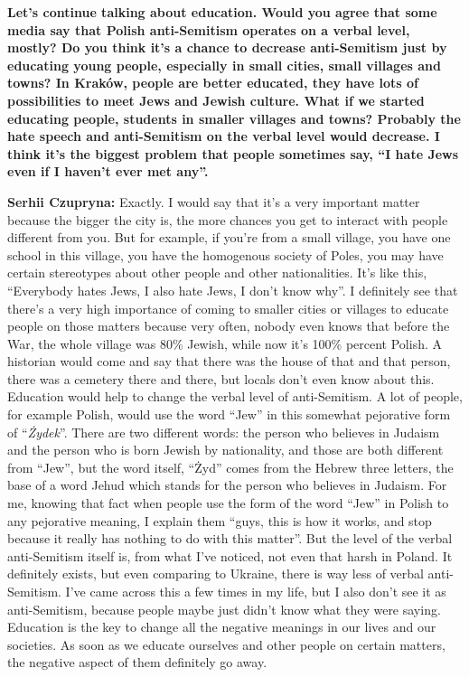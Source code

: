 \textbf{Let’s continue talking about education. Would you agree that some media say that Polish anti-Semitism operates on a verbal level, mostly? Do you think it’s a chance to decrease anti-Semitism just by educating young people, especially in small cities, small villages and towns? In Kraków, people are better educated, they have lots of possibilities to meet Jews and Jewish culture. What if we started educating people, students in smaller villages and towns? Probably the hate speech and anti-Semitism on the verbal level would decrease. I think it’s the biggest problem that people sometimes say, ``I hate Jews even if I haven’t ever met any''.} \par
\textbf{Serhii Czupryna:} Exactly. I would say that it’s a very important matter because the bigger the city is, the more chances you get to interact with people different from you. But for example, if you’re from a small village, you have one school in this village, you have the homogenous society of Poles, you may have certain stereotypes about other people and other nationalities. It’s like this, ``Everybody hates Jews, I also hate Jews, I don’t know why''. I definitely see that there’s a very high importance of coming to smaller cities or villages to educate people on those matters because very often, nobody even knows that before the War, the whole village was 80\% Jewish, while now it’s 100\% percent Polish. A historian would come and say that there was the house of that and that person, there was a cemetery there and there, but locals don’t even know about this. Education would help to change the verbal level of anti-Semitism. A lot of people, for example Polish, would use the word ``Jew'' in this somewhat pejorative form of ``\textit{Żydek}''. There are two different words: the person who believes in Judaism and the person who is born Jewish by nationality, and those are both different from ``Jew'', but the word itself, ``Żyd'' comes from the Hebrew three letters, the base of a word Jehud which stands for the person who believes in Judaism. For me, knowing that fact when people use the form of the word ``Jew'' in Polish to any pejorative meaning, I explain them ``guys, this is how it works, and stop because it really has nothing to do with this matter''. But the level of the verbal anti-Semitism itself is, from what I’ve noticed, not even that harsh in Poland. It definitely exists, but even comparing to Ukraine, there is way less of verbal anti-Semitism. I’ve came across this a few times in my life, but I also don’t see it as anti-Semitism, because people maybe just didn’t know what they were saying. Education is the key to change all the negative meanings in our lives and our societies. As soon as we educate ourselves and other people on certain matters, the negative aspect of them definitely go away.\par 
